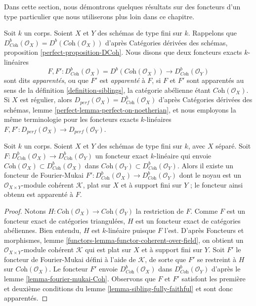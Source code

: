 \noindent
Dans cette section, nous démontrons quelques résultats sur des foncteurs d'un type particulier
que nous utiliserons plus loin dans ce chapitre.

\begin{definition}
\label{definition-siblings-geometric}
Soit $k$ un corps. Soient $X$ et $Y$ des schémas de type fini sur $k$.
Rappelons que
$D^b_{\textit{Coh}}(\mathcal{O}_X) = D^b(\textit{Coh}(\mathcal{O}_X))$
d'après Catégories dérivées des schémas, proposition \ref{perfect-proposition-DCoh}.
Nous disons que deux foncteurs exacts $k$-linéaires
$$
F, F' :
D^b_{\textit{Coh}}(\mathcal{O}_X) = D^b(\textit{Coh}(\mathcal{O}_X))
\longrightarrow
D^b_{\textit{Coh}}(\mathcal{O}_Y)
$$
sont dits {\it apparentés}, ou que $F'$ est {\it apparenté} à $F$, si $F$ et $F'$
sont apparentés au sens de la définition \ref{definition-siblings},
la catégorie abélienne étant $\textit{Coh}(\mathcal{O}_X)$.
Si $X$ est régulier, alors
$D_{perf}(\mathcal{O}_X) = D^b_{\textit{Coh}}(\mathcal{O}_X)$ d'après
Catégories dérivées des schémas, lemme \ref{perfect-lemma-perfect-on-noetherian},
et nous employons la même terminologie pour les foncteurs exacts $k$-linéaires
$F, F' : D_{perf}(\mathcal{O}_X) \to D_{perf}(\mathcal{O}_Y)$.
\end{definition}

\begin{lemma}
\label{lemma-exact-functor-preserving-Coh}
Soit $k$ un corps. Soient $X$ et $Y$ des schémas de type fini sur $k$, avec
$X$ séparé. Soit
$F : D^b_{\textit{Coh}}(\mathcal{O}_X) \to D^b_{\textit{Coh}}(\mathcal{O}_Y)$
un foncteur exact $k$-linéaire qui envoie
$\textit{Coh}(\mathcal{O}_X) \subset D^b_{\textit{Coh}}(\mathcal{O}_X)$
dans
$\textit{Coh}(\mathcal{O}_Y) \subset D^b_{\textit{Coh}}(\mathcal{O}_Y)$.
Alors il existe un foncteur de Fourier-Mukai
$F' : D^b_{\textit{Coh}}(\mathcal{O}_X) \to D^b_{\textit{Coh}}(\mathcal{O}_Y)$
dont le noyau est un $\mathcal{O}_{X \times Y}$-module cohérent $\mathcal{K}$,
plat sur $X$ et à support fini sur $Y$ ; le foncteur ainsi obtenu est apparenté à $F$.
\end{lemma}

\begin{proof}
Notons $H : \textit{Coh}(\mathcal{O}_X) \to \textit{Coh}(\mathcal{O}_Y)$
la restriction de $F$. Comme $F$ est un foncteur exact de catégories
triangulées, $H$ est un foncteur exact de catégories abéliennes.
Bien entendu, $H$ est $k$-linéaire puisque $F$ l'est. D'après
Foncteurs et morphismes, lemme \ref{functors-lemma-functor-coherent-over-field},
on obtient un $\mathcal{O}_{X \times Y}$-module cohérent
$\mathcal{K}$ qui est plat sur $X$ et à support fini sur $Y$.
Soit $F'$ le foncteur de Fourier-Mukai défini à l'aide de $\mathcal{K}$,
de sorte que $F'$ se restreint à $H$ sur $ \textit{Coh}(\mathcal{O}_X)$.
Le foncteur $F'$ envoie $D^b_{\textit{Coh}}(\mathcal{O}_X)$
dans $D^b_{\textit{Coh}}(\mathcal{O}_Y)$ d'après le
lemme \ref{lemma-fourier-mukai-Coh}.
Observons que $F$ et $F'$ satisfont les première et deuxième
conditions du lemme \ref{lemma-sibling-fully-faithful} et sont donc apparentés.
\end{proof}

